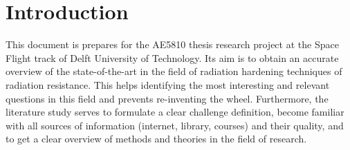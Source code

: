 \section{Introduction}\label{sec:introduction}

This document is prepares for the AE5810 thesis research project at the Space Flight track of Delft University of Technology. Its aim is to %
obtain an accurate overview of the state-of-the-art in the field of radiation hardening techniques of radiation resistance. This helps identifying the most interesting and relevant questions in this field and prevents re-inventing the wheel. Furthermore, the literature study serves to formulate a clear challenge definition, become familiar with all sources of information (internet, library, courses) and their quality, and to get a clear overview of methods and theories in the field of research. 

